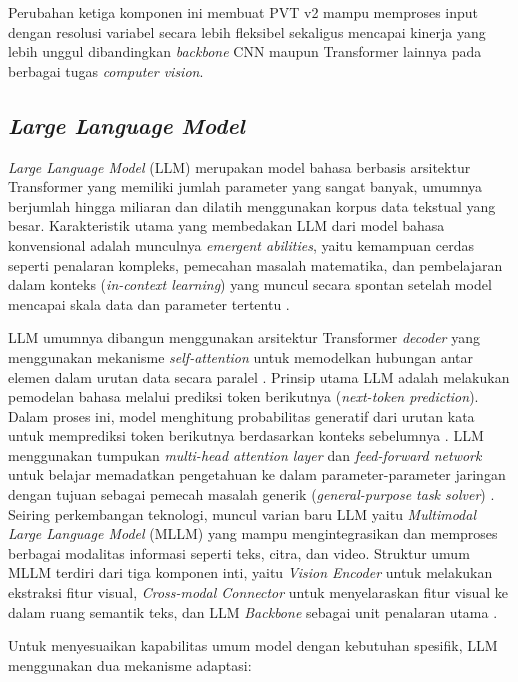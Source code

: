 Perubahan ketiga komponen ini membuat PVT v2 mampu memproses input dengan resolusi variabel secara lebih fleksibel sekaligus mencapai kinerja yang lebih unggul dibandingkan \textit{backbone} CNN maupun Transformer lainnya pada berbagai tugas \textit{computer vision}.

\subsection{\textit{Large Language Model}}

\textit{Large Language Model} (LLM) merupakan model bahasa berbasis arsitektur Transformer yang memiliki jumlah parameter yang sangat banyak, umumnya berjumlah hingga miliaran dan dilatih menggunakan korpus data tekstual yang besar. Karakteristik utama yang membedakan LLM dari model bahasa konvensional adalah munculnya \textit{emergent abilities}, yaitu kemampuan cerdas seperti penalaran kompleks, pemecahan masalah matematika, dan pembelajaran dalam konteks (\textit{in-context learning}) yang muncul secara spontan setelah model mencapai skala data dan parameter tertentu \parencite{Zhao2025}.

LLM umumnya dibangun menggunakan arsitektur Transformer \textit{decoder} yang menggunakan mekanisme \textit{self-attention} untuk memodelkan hubungan antar elemen dalam urutan data secara paralel \parencite{Cheng2025}. Prinsip utama LLM adalah melakukan pemodelan bahasa melalui prediksi token berikutnya (\textit{next-token prediction}). Dalam proses ini, model menghitung probabilitas generatif dari urutan kata untuk memprediksi token berikutnya berdasarkan konteks sebelumnya \parencite{Zhao2025}. LLM menggunakan tumpukan \textit{multi-head attention layer} dan \textit{feed-forward network} untuk belajar memadatkan pengetahuan ke dalam parameter-parameter jaringan dengan tujuan sebagai pemecah masalah generik (\textit{general-purpose task solver}) \parencite{Cheng2025, Zhao2025}. Seiring perkembangan teknologi, muncul varian baru LLM yaitu \textit{Multimodal Large Language Model} (MLLM) yang mampu mengintegrasikan dan memproses berbagai modalitas informasi seperti teks, citra, dan video. Struktur umum MLLM terdiri dari tiga komponen inti, yaitu \textit{Vision Encoder} untuk melakukan ekstraksi fitur visual, \textit{Cross-modal Connector} untuk menyelaraskan fitur visual ke dalam ruang semantik teks, dan LLM \textit{Backbone} sebagai unit penalaran utama \parencite{Wang2024}.

Untuk menyesuaikan kapabilitas umum model dengan kebutuhan spesifik, LLM menggunakan dua mekanisme adaptasi:

